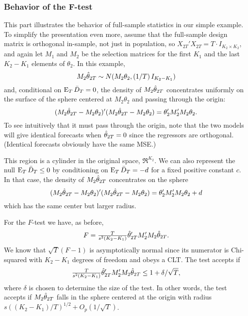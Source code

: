 \documentclass[12pt]{article}
\begin{document}
\subsubsection*{Behavior of the F-test}

This part illustrates the behavior of full-sample statistics in our
simple example. To simplify the presentation even more, assume that
the full-sample design matrix is orthogonal in-sample, not just in
population, so $X_{2T}'X_{2T} = T \cdot I_{K_2 \times K_2}$, and again
let $M_1$ and $M_2$ be the selection matrices for the first $K_1$ and
the last $K_2-K_1$ elements of $\theta_2$. In this example,
\begin{equation*}
  M_2 \hat\theta_{2T} \sim
  N(M_2 \theta_2, (1/T) \, I_{K_2-K_1})
\end{equation*}
and, conditional on $\operatorname{E}_T \bar{D}_{T} = 0$, the density of $M_2 \hat\theta_{2T}$
concentrates uniformly on the surface of the sphere centered at $M_2
\theta_2$ and passing through the origin:
\begin{equation*}
  (M_2 \hat\theta_{2T} - M_2 \theta_2)'(M_2 \hat\theta_{2T} - M_2 \theta_2) =
  \theta_2'M_2' M_2 \theta_2.
\end{equation*}
To see intuitively that it must pass through the origin, note that the
two models will give identical forecasts when $\hat\theta_{2T} = 0$ since the
regressors are orthogonal. (Identical forecasts obviously have the
same MSE.)

This region is a cylinder in the original space, $\Re^{K_2}$.  We can
also represent the null $\operatorname{E}_T \bar{D}_{T} \leq 0$ by conditioning on $\operatorname{E}_T
\bar{D}_{T} = -d$ for a fixed positive constant $c$. In that case, the
density of $M_2 \hat\theta_{2T}$ concentrates on the sphere
\begin{equation*}
  (M_2 \hat\theta_{2T} - M_2 \theta_2)'(M_2 \hat\theta_{2T} - M_2 \theta_2) =
  \theta_2'M_2' M_2 \theta_2 + d
\end{equation*}
which has the same center but larger radius.

For the $F$-test we have, as before,
\begin{equation*}
  F = \tfrac{T}{s^2 (K_2 - K_1)} \hat\theta_{2T}' M_2' M_2 \hat\theta_{2T}.
\end{equation*}
We know that $\sqrt{T}(F - 1)$ is asymptotically normal since its
numerator is Chi-squared with $K_2-K_1$ degrees of freedom and obeys a
CLT.  The test accepts if
\begin{equation}\label{eq:26}
  \tfrac{T}{s^2 (K_2 - K_1)} \hat\theta_{2T}' M_2' M_2 \hat\theta_{2T}
  \leq 1 + \delta / \sqrt{T},
\end{equation}
where $\delta$ is chosen to determine the size of the test. In other
words, the test accepts if $M_2 \hat\theta_{2T}$ falls in the sphere centered
at the origin with radius $s ((K_2 - K_1) / T)^{1/2} +
O_p(1/\sqrt{T})$.
\end{document}
